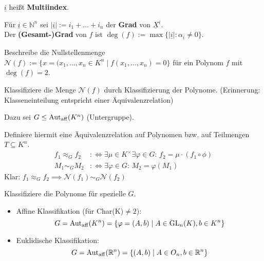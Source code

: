 \documentclass[parskip,a4paper,twoside,DIV15,BCOR12mm]{scrbook}
\begin{document}
\(\underline{i}\) heißt \textbf{Multiindex}.
\begin{definition}
Für \(\underline{i}\in\mathbb{N}^{n}\) sei \(|\underline{i}|:=i_{1}+\ldots+i_{n}\) der \textbf{Grad} von \(\underline{X}^{\underline{i}}\).\\
Der \textbf{(Gesamt-)Grad} von \(f\) ist \(\deg(f):=\max\{|\underline{i}|:\alpha_{\underline{i}}\neq0\}\).
\end{definition}

\begin{ziel}
Beschreibe die Nullstellenmenge
\(\mathcal{N}(f):=\{x=(x_{1},\dots,x_{n}\in K^{n}\mid f(x_{1},\dots,x_{n})=0\}\)
für ein Polynom \(f\) mit \(\deg(f)=2\).
\end{ziel} 

\begin{comment}
Den Fall eines oder mehrerer Polynome vom Grad 1 erledigt die lineare Algebra.
Mehrere Polynome vom Grad \(\geq 2\) behandelt die \textbf{Kommutative Algebra 
und algebraische Geometrie}.
\end{comment}

\begin{prepwork}
Klassifiziere die Menge \(\mathcal{N}(f)\) durch
Klassifizierung der Polynome. (Erinnerung: Klasseneinteilung entspricht einer
\"Aquivalenzrelation)

Dazu sei \(G\leq\operatorname{Aut_{aff}}(K^{n})\) (Untergruppe).

Definiere hiermit eine \"Aquivalenzrelation auf Polynomen bzw. auf Teilmengen
\(T\subseteq K^{n}\).
\begin{align*}
f_{1}\approx_{G}f_{2}&:\Longleftrightarrow\exists\mu\in K^{\times}\exists\varphi
\in G:\,f_{2}=\mu\cdot (f_{1}\circ\phi)\\
M_{1}\sim_{G}M_{2}&:\Longleftrightarrow\exists\varphi\in G:\,M_{2}=\varphi(M_{1})
\end{align*}
Klar: \(f_{1}\approx_{G}f_{2}\implies\mathcal{N}(f_{1})\sim_{G}\mathcal{N}(f_{2})\)
\end{prepwork}

\begin{ziel}
Klassifiziere die Polynome für spezielle \(G\).
\begin{itemize}
\item Affine Klassifikation (für Char(K)\(\neq 2\)): 
\[
G=\operatorname{Aut_{aff}}(K^{n})=\{\varphi=(A,b)\mid A\in\operatorname{GL}_{n}(K),b\in K^{n}\}
\]
\item Euklidische Klassifikation: 
\[
G=\operatorname{Aut_{aff}}(\mathbb{R}^{n})=\{(A,b)\mid A\in O_{n},b\in\mathbb{R}^{n}\}
\]
\end{itemize}
\end{ziel}
\end{document}
